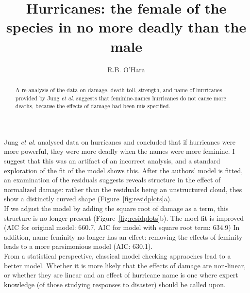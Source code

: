 \documentclass{pnastwo}\usepackage[]{graphicx}\usepackage[]{color}
\begin{document}
\title{Hurricanes: the female of the species in no more deadly than the male}
\author{R.B. O'Hara}

\maketitle

\begin{article}
\begin{abstract}
{A re-analysis of the data on damage, death toll, strength, and name of hurricanes provided by Jung {\em  et al.} \cite{1} suggests that feminine-names hurricanes do not cause more deaths, because the effects of damage had been mis-specified.}
\end{abstract}






Jung {\em et al.} \cite{1} analysed data on hurricanes and concluded that if hurricanes were more powerful, they were more deadly when the names were more feminine. I suggest that this was an artifact of an incorrect analysis, and a standard exploration of the fit of the model shows this. After the authors' model is fitted, an examination of the residuals suggests reveals structure in the effect of normalized damage: rather than the residuals being an unstructured cloud, thes show a distinctly curved shape (Figure~\ref{fig:residplots}a).\\

If we adjust the model by adding the square root of damage as a term, this structure is no longer present (Figure~\ref{fig:residplots}b). The moel fit is improved (AIC for original model: 660.7, AIC for model with square root term: 634.9) In addition, name feminity no longer has an effect: removing the effects of feminity leads to a more parsimonious model (AIC: 630.1).\\

From a statistical perspective, classical model checking appraoches lead to a better model. Whether it is more likely that the effects of damage are non-linear, or whether they are linear and an effect of hurricane name is one where expert knowledge (of those studying responses to disaster) should be called upon.


\end{article}
\end{document}
